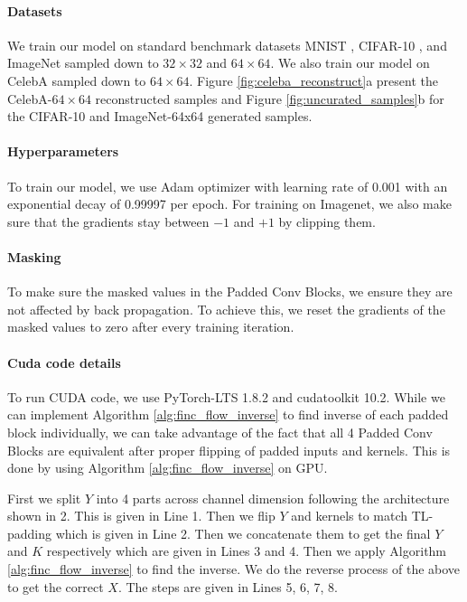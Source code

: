 \documentclass[a4paper,twoside]{article}
\theoremstyle{definition}
\begin{document}
\paragraph{Datasets}
We train our model on standard benchmark datasets MNIST \citep{deng2012mnist}, CIFAR-10 \citep{krizhevsky2009learning}, and ImageNet \citep{russakovsky2015imagenet} sampled down to $32 \times 32$ and $64 \times 64$. We also train our model on CelebA \citep{liu2015deep} sampled down to $64 \times 64$. Figure \ref{fig:celeba_reconstruct}a present the CelebA-$64 \times 64$ reconstructed samples and Figure \ref{fig:uncurated_samples}b for the CIFAR-10 and ImageNet-64x64 generated samples.

\paragraph{Hyperparameters}
To train our model, we use Adam optimizer \citep{kingma2014adam} with learning rate of 0.001 with an exponential decay of 0.99997 per epoch. For training on Imagenet, we also make sure that the gradients stay between $-1$ and $+1$ by clipping them. 

\paragraph{Masking}
To make sure the masked values in the Padded Conv Blocks, we ensure they are not affected by back propagation. To achieve this, we reset the gradients of the masked values to zero after every training iteration.

\paragraph{Cuda code details}
To run CUDA code, we use PyTorch-LTS 1.8.2 and cudatoolkit 10.2. While we can implement Algorithm \ref{alg:finc_flow_inverse} to find inverse of each padded block individually, we can take advantage of the fact that all 4 Padded Conv Blocks are equivalent after proper flipping of padded inputs and kernels. This is done by using Algorithm \ref{alg:finc_flow_inverse} on GPU.

\noindent
First we split $Y$ into 4 parts across channel dimension following the architecture shown in 2. This is given in Line 1. Then we flip $Y$ and kernels to match TL-padding which is given in Line 2. Then we concatenate them to get the final $Y$ and $K$ respectively which are given in Lines 3 and 4. Then we apply Algorithm \ref{alg:finc_flow_inverse} to find the inverse. We do the reverse process of the above to get the correct $X$. The steps are given in Lines 5, 6, 7, 8.
\end{document}
